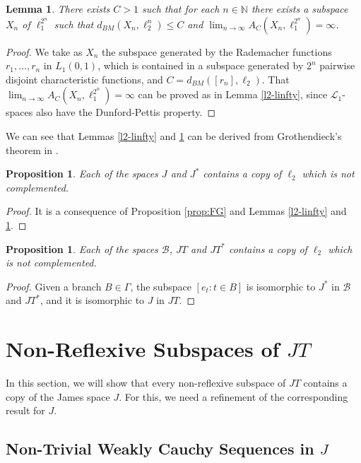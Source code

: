 \documentclass[12pt]{amsart}
\theoremstyle{plain}
\numberwithin{equation}{section}
\newcommand{\N}{\mathbb{N}}
\newcommand{\B}{\mathcal{B}}
\newcommand{\Lc}{\mathcal{L}}
\newtheorem{lemma}[theorem]{Lemma}
\newtheorem{proposition}[theorem]{Proposition}
\begin{document}
\begin{lemma}\label{l2-l1}
There exists $C>1$ such that for each $n\in\N$ there exists a subspace $X_n$ of $\ell_1^{2^n}$ such that $d_{BM}(X_n,\ell_2^n)\leq C$ and
$\lim_{n\to\infty} A_C(X_n,\ell_1^{2^n}) =\infty$.
\end{lemma}
\begin{proof}
We take as $X_n$ the subspace generated by the Rademacher functions $r_1,\ldots,r_n$ in $L_1(0,1)$, which is contained in a subspace
generated by $2^n$ pairwise disjoint characteristic functions, and $C=d_{BM}([r_n],\ell_2)$.
That $\lim_{n\to\infty} A_C(X_n, \ell_1^{2^n}) =\infty$ can be proved as in Lemma \ref{l2-linfty}, since $\Lc_1$-spaces also have the Dunford-Pettis property.
\end{proof}

We can see that Lemmas \ref{l2-linfty} and \ref{l2-l1} can be derived from Grothendieck's theorem in \cite[Section]{LP:68}.

\begin{proposition}
Each of the spaces $J$ and $J^*$ contains a copy of $\ell_2$ which is not complemented.
\end{proposition}
\begin{proof}
It is a consequence of Proposition \ref{prop:FG} and Lemmas \ref{l2-linfty} and \ref{l2-l1}.
\end{proof}

\begin{proposition}
Each of the spaces $\B$, $JT$ and $JT^*$ contains a copy of $\ell_2$ which is not complemented.
\end{proposition}
\begin{proof}
Given a branch $B\in\Gamma$, the subspace $[e_t : t\in B]$ is isomorphic to $J^*$ in $\B$ and $JT^*$, and it is isomorphic to $J$ in $JT$.
\end{proof}

\section{Non-Reflexive Subspaces of $JT$}

In this section, we will show that every non-reflexive subspace of $JT$ contains a copy of the James space $J$. For this, we need a refinement of the
corresponding result for $J$.

\subsection{Non-Trivial Weakly Cauchy Sequences in $J$}
\end{document}
